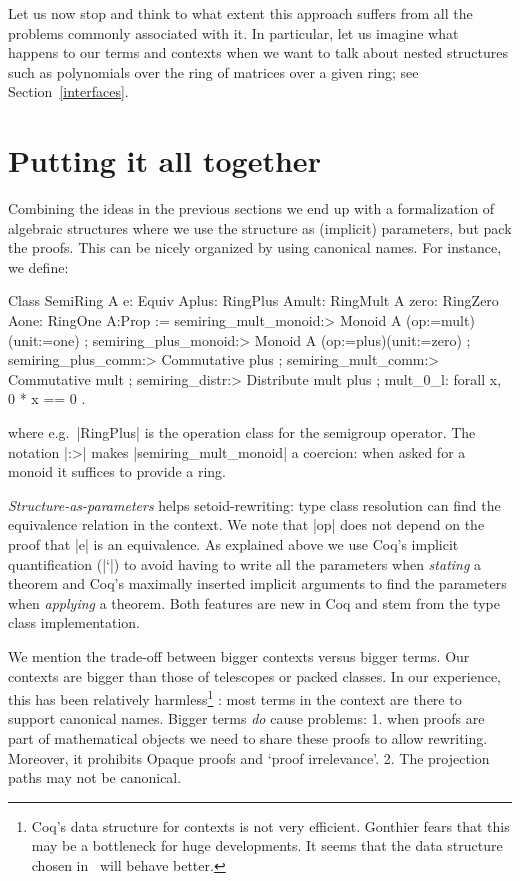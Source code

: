 \documentclass[a4paper,10pt, runningheads]{llncs}
\begin{document}
Let us now stop and think to what extent this approach suffers from all the problems commonly
associated with it. In particular, let us imagine what happens to our terms and contexts when we
want to talk about nested structures such as polynomials over the ring of matrices over a
given ring; see Section~\ref{interfaces}.

\section{Putting it all together}\label{classes}
Combining the ideas in the previous sections we end up with a formalization of algebraic
structures where we use the structure as (implicit) parameters, but
pack the proofs. This can be nicely organized by using canonical names. For instance, we define:
\begin{code}
Class SemiRing A {e: Equiv A}{plus: RingPlus A}{mult: RingMult A}
                 {zero: RingZero A}{one: RingOne A}:Prop :=
  { semiring_mult_monoid:> Monoid A (op:=mult)(unit:=one)
  ; semiring_plus_monoid:> Monoid A (op:=plus)(unit:=zero)
  ; semiring_plus_comm:> Commutative plus
  ; semiring_mult_comm:> Commutative mult
  ; semiring_distr:> Distribute mult plus
  ; mult_0_l: forall x, 0 * x == 0 }.
\end{code}
where e.g.\ |RingPlus| is the operation class for the semigroup operator.
The notation |:>| makes |semiring_mult_monoid| a coercion: when asked for a monoid it suffices to
provide a ring.

\emph{Structure-as-parameters} helps setoid-rewriting: type class resolution
can find the equivalence relation in the context.
We note that |op| does not depend on the proof that |e| is an equivalence. As explained above we
use Coq's implicit quantification (|`{}|) to avoid having to write all the parameters when
\emph{stating} a theorem and Coq's maximally inserted implicit arguments to find the parameters when
\emph{applying} a theorem. Both features are new in Coq and stem from the type class implementation.

We mention the trade-off between bigger contexts versus bigger terms. Our contexts are bigger than
those of telescopes or packed classes. In our experience, this has been relatively
harmless\footnote{Coq's data structure for contexts is not very efficient. Gonthier fears that this
may be a bottleneck for huge developments. It seems that the data structure chosen
in~\cite{asperti2009compact} will behave better.}%
: most terms in the context are there to support canonical names. Bigger terms
\emph{do} cause problems: 1. when proofs are part of mathematical objects we need to share these
proofs to allow rewriting. Moreover, it prohibits Opaque proofs and `proof irrelevance'. 2. The
projection paths may not be canonical.
\end{document}
